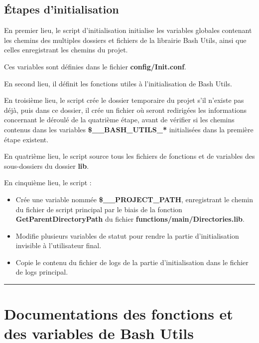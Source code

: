 \documentclass[a4paper,10pt]{article}
\begin{document}
\color{green}
\subsection{Étapes d'initialisation}\color{white}
En premier lieu, le script d'initialisation initialise les variables globales contenant les chemins des multiples dossiers et fichiers de la librairie Bash Utils, ainsi que celles enregistrant les chemins du projet.

Ces variables sont définies dans le fichier \color{lime}\textbf{config/Init.conf}\color{white}.

En second lieu, il définit les fonctions utiles à l'initialisation de Bash Utils.

En troisième lieu, le script crée le dossier temporaire du projet s'il n'existe pas déjà, puis dans ce dossier, il crée un fichier où seront redirigées les informations concernant le déroulé de la quatrième étape, avant de vérifier si les chemins contenus dans les variables \color{orange}\textbf{\$\_\_BASH\_UTILS\_*}\color{white} initialisées dans la première étape existent.

En quatrième lieu, le script source tous les fichiers de fonctions et de variables des sous-dossiers du dossier \color{lime}\textbf{lib}\color{white}.

En cinquième lieu, le script :
\begin{itemize}
    \item Crée une variable nommée \color{orange}\textbf{\$\_\_PROJECT\_PATH}\color{white}, enregistrant le chemin du fichier de script principal par le biais de la fonction \color{mauve}\textbf{GetParentDirectoryPath} \color{white} du fichier \color{lime}\textbf{functions/main/Directories.lib}\color{white}.
    
    \item Modifie plusieurs variables de statut pour rendre la partie d'initialisation invisible à l'utilisateur final.
    
    \item Copie le contenu du fichier de logs de la partie d'initialisation dans le fichier de logs principal.\\[1\baselineskip]
\end{itemize}

\color{red}\par\noindent\rule{\textwidth}{0.4pt}\color{white}

\color{red}
\section{Documentations des fonctions et des variables de Bash Utils}\color{white}
\end{document}
